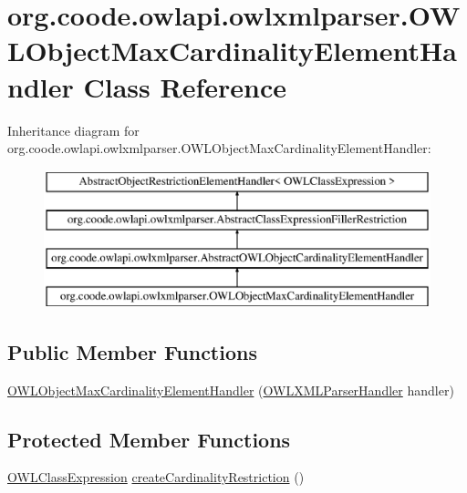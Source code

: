 \hypertarget{classorg_1_1coode_1_1owlapi_1_1owlxmlparser_1_1_o_w_l_object_max_cardinality_element_handler}{\section{org.\-coode.\-owlapi.\-owlxmlparser.\-O\-W\-L\-Object\-Max\-Cardinality\-Element\-Handler Class Reference}
\label{classorg_1_1coode_1_1owlapi_1_1owlxmlparser_1_1_o_w_l_object_max_cardinality_element_handler}
}
Inheritance diagram for org.\-coode.\-owlapi.\-owlxmlparser.\-O\-W\-L\-Object\-Max\-Cardinality\-Element\-Handler\-:\begin{figure}[H]
\begin{center}
\leavevmode
\includegraphics[height=4.000000cm]{classorg_1_1coode_1_1owlapi_1_1owlxmlparser_1_1_o_w_l_object_max_cardinality_element_handler}
\end{center}
\end{figure}
\subsection*{Public Member Functions}
\begin{DoxyCompactItemize}
\item 
\hyperlink{classorg_1_1coode_1_1owlapi_1_1owlxmlparser_1_1_o_w_l_object_max_cardinality_element_handler_affeca68fbcb093741f76db788fa9660b}{O\-W\-L\-Object\-Max\-Cardinality\-Element\-Handler} (\hyperlink{classorg_1_1coode_1_1owlapi_1_1owlxmlparser_1_1_o_w_l_x_m_l_parser_handler}{O\-W\-L\-X\-M\-L\-Parser\-Handler} handler)
\end{DoxyCompactItemize}
\subsection*{Protected Member Functions}
\begin{DoxyCompactItemize}
\item 
\hyperlink{interfaceorg_1_1semanticweb_1_1owlapi_1_1model_1_1_o_w_l_class_expression}{O\-W\-L\-Class\-Expression} \hyperlink{classorg_1_1coode_1_1owlapi_1_1owlxmlparser_1_1_o_w_l_object_max_cardinality_element_handler_a4fda54486333a0cbef73e94559460a09}{create\-Cardinality\-Restriction} ()
\end{DoxyCompactItemize}


